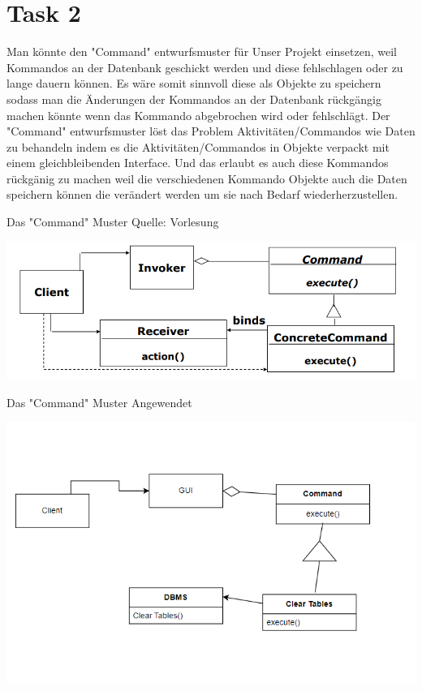 \chapter{Task 2}
\begin{parlist}
   \item Man könnte den "Command" entwurfsmuster für Unser Projekt einsetzen, weil Kommandos an der Datenbank geschickt werden und diese fehlschlagen oder zu lange dauern können. Es wäre somit sinnvoll diese als Objekte zu speichern sodass man die Änderungen der Kommandos an der Datenbank rückgängig machen könnte wenn das Kommando abgebrochen wird oder fehlschlägt. Der "Command" entwurfsmuster löst das Problem Aktivitäten/Commandos wie Daten zu behandeln indem es die Aktivitäten/Commandos in Objekte verpackt mit einem gleichbleibenden Interface. Und das erlaubt es auch diese Kommandos rückgänig zu machen weil die verschiedenen Kommando Objekte auch die Daten speichern können die verändert werden um sie nach Bedarf wiederherzustellen.
   \item Das "Command" Muster Quelle: Vorlesung
  \begin{center}
   \includegraphics[width=\textwidth]{Immagini/b}
  \end{center}
   \item Das "Command" Muster Angewendet
     \begin{center}
   \includegraphics[width=\textwidth]{Immagini/a}

\end{center}
\end{parlist}

